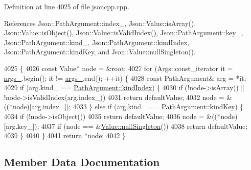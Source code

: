 Definition at line 4025 of file jsoncpp.\+cpp.



References Json\+::\+Path\+Argument\+::index\+\_\+, Json\+::\+Value\+::is\+Array(), Json\+::\+Value\+::is\+Object(), Json\+::\+Value\+::is\+Valid\+Index(), Json\+::\+Path\+Argument\+::key\+\_\+, Json\+::\+Path\+Argument\+::kind\+\_\+, Json\+::\+Path\+Argument\+::kind\+Index, Json\+::\+Path\+Argument\+::kind\+Key, and Json\+::\+Value\+::null\+Singleton().


\begin{DoxyCode}
4025                                                                       \{
4026   \textcolor{keyword}{const} Value* node = &root;
4027   \textcolor{keywordflow}{for} (Args::const\_iterator it = \hyperlink{class_json_1_1_path_af33d0de7ee9f99d3e361bdf504dc2bc7}{args\_}.begin(); it != \hyperlink{class_json_1_1_path_af33d0de7ee9f99d3e361bdf504dc2bc7}{args\_}.end(); ++it) \{
4028     \textcolor{keyword}{const} PathArgument& arg = *it;
4029     \textcolor{keywordflow}{if} (arg.kind\_ == \hyperlink{class_json_1_1_path_argument_a2420bbad778573c147e578701b84d9b9ae5a976b898111903334cb131f5e03dc4}{PathArgument::kindIndex}) \{
4030       \textcolor{keywordflow}{if} (!node->isArray() || !node->isValidIndex(arg.index\_))
4031         \textcolor{keywordflow}{return} defaultValue;
4032       node = &((*node)[arg.index\_]);
4033     \} \textcolor{keywordflow}{else} \textcolor{keywordflow}{if} (arg.kind\_ == \hyperlink{class_json_1_1_path_argument_a2420bbad778573c147e578701b84d9b9a74f5968d06c01701b7a46092c33ba7d1}{PathArgument::kindKey}) \{
4034       \textcolor{keywordflow}{if} (!node->isObject())
4035         \textcolor{keywordflow}{return} defaultValue;
4036       node = &((*node)[arg.key\_]);
4037       \textcolor{keywordflow}{if} (node == &\hyperlink{class_json_1_1_value_af2f124567acc35d021a424e53ebdfcab}{Value::nullSingleton}())
4038         \textcolor{keywordflow}{return} defaultValue;
4039     \}
4040   \}
4041   \textcolor{keywordflow}{return} *node;
4042 \}
\end{DoxyCode}


\subsection{Member Data Documentation}
\mbox{\label{class_json_1_1_path_af33d0de7ee9f99d3e361bdf504dc2bc7}} 
